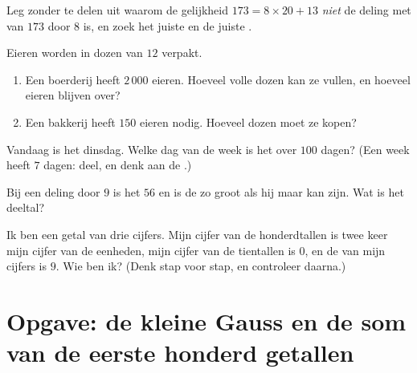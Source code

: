 \begin{exercise}[$\star$]\label{exo:g6:wholes:8}
Leg zonder te delen uit waarom de gelijkheid $173 = 8 \times 20 + 13$
\emph{niet} de deling met  van $173$ door $8$ is, en zoek het juiste
 en de juiste .
\end{exercise}

\begin{exercise}[$\star\star$]\label{exo:g6:wholes:9}
Eieren worden in dozen van $12$ verpakt.
\begin{enumerate}
  \item Een boerderij heeft $2\,000$ eieren. Hoeveel volle dozen kan ze
        vullen, en hoeveel eieren blijven over?
  \item Een bakkerij heeft $150$ eieren nodig. Hoeveel dozen moet ze kopen?
\end{enumerate}
\end{exercise}

\begin{exercise}[$\star\star$]\label{exo:g6:wholes:10}
Vandaag is het dinsdag. Welke dag van de week is het over $100$ dagen? (Een
week heeft $7$ dagen: deel, en denk aan de .)
\end{exercise}

\begin{exercise}[$\star\star$]\label{exo:g6:wholes:11}
Bij een deling door $9$ is het  $56$ en is de  zo groot als hij
maar kan zijn. Wat is het deeltal?
\end{exercise}

\begin{exercise}[$\star\star\star$]\label{exo:g6:wholes:12}
Ik ben een getal van drie cijfers. Mijn cijfer van de honderdtallen is twee
keer mijn cijfer van de eenheden, mijn cijfer van de tientallen is $0$, en de
 van mijn cijfers is $9$. Wie ben ik? (Denk stap voor stap, en controleer
daarna.)
\end{exercise}

\section{Opgave: de kleine Gauss en de som van de eerste honderd
getallen}


